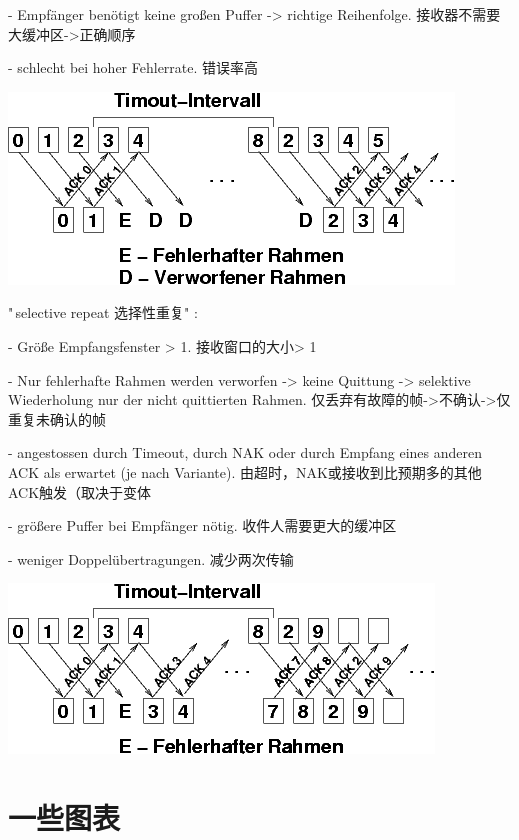 \documentclass[fleqn]{article}
\begin{document}
- Empfänger benötigt keine großen Puffer -> richtige Reihenfolge. 接收器不需要大缓冲区->正确顺序

- schlecht bei hoher Fehlerrate. 错误率高



\begin{center}
    \includegraphics[scale=0.6]{bild29.png}
\end{center}


"\,selective repeat 选择性重复" :

- Größe Empfangsfenster > 1. 接收窗口的大小> 1 

- Nur fehlerhafte Rahmen werden verworfen -> keine Quittung -> selektive Wiederholung nur der nicht quittierten Rahmen. 仅丢弃有故障的帧->不确认->仅重复未确认的帧  

- angestossen durch Timeout, durch NAK oder durch Empfang eines anderen ACK als erwartet (je nach Variante). 由超时，NAK或接收到比预期多的其他ACK触发（取决于变体 

- größere Puffer bei Empfänger nötig. 收件人需要更大的缓冲区  

- weniger Doppelübertragungen. 减少两次传输

\begin{center}
    \includegraphics[scale=0.6]{bild30.png}
\end{center}

\clearpage
\section{一些图表}
\end{document}
